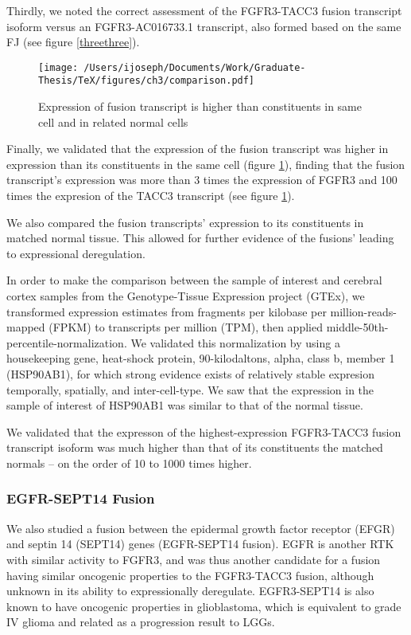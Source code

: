 Thirdly, we noted the correct assessment of the FGFR3-TACC3 fusion transcript isoform versus an FGFR3-AC016733.1 transcript, also formed based on the same FJ (see figure \ref{threethree}).


\begin{figure}
  \centering \texttt{[image: /Users/ijoseph/Documents/Work/Graduate-Thesis/TeX/figures/ch3/comparison.pdf]}
  \caption{Expression of fusion transcript is higher than constituents in same cell and in related normal cells}\label{threefour}
\end{figure}


Finally, we validated that the expression of the fusion transcript was higher in expression than its constituents in the same cell (figure \ref{threefour}), finding that the fusion transcript's expression was more than 3 times the expression of FGFR3 and 100 times the expresion of the TACC3 transcript (see figure \ref{threefour}).

We also compared the fusion transcripts' expression to its constituents in matched normal tissue. This allowed for further evidence of the fusions' leading to expressional deregulation.

In order to make the comparison between the sample of interest and cerebral cortex samples from the Genotype-Tissue Expression project (GTEx)\cite{lonsdale_genotype-tissue_2013}, we transformed expression estimates from fragments per kilobase per million-reads-mapped (FPKM) to transcripts per million (TPM), then applied middle-50th-percentile-normalization\cite{_what_2014}. We validated this normalization by using a housekeeping gene, heat-shock protein, 90-kilodaltons, alpha, class b, member 1 (HSP90AB1), for which strong evidence exists of relatively stable expresion temporally, spatially, and inter-cell-type. We saw that the expression in the sample of interest of HSP90AB1 was similar to that of the normal tissue.

We validated that the expresson of the highest-expression FGFR3-TACC3 fusion transcript isoform was much higher than that of its constituents the matched normals -- on the order of 10 to 1000 times higher.

\subsubsection{EGFR-SEPT14 Fusion}

We also studied a fusion between the epidermal growth factor receptor (EFGR) and septin 14 (SEPT14) genes (EGFR-SEPT14 fusion). EGFR is another RTK with similar activity to FGFR3, and was thus another candidate for a fusion having similar oncogenic properties to the FGFR3-TACC3 fusion, although unknown in its ability to expressionally deregulate. EGFR3-SEPT14 is also known to have oncogenic properties in glioblastoma, which is equivalent to grade IV glioma and related as a progression result to LGGs\cite{_omim_2016-1}. 

